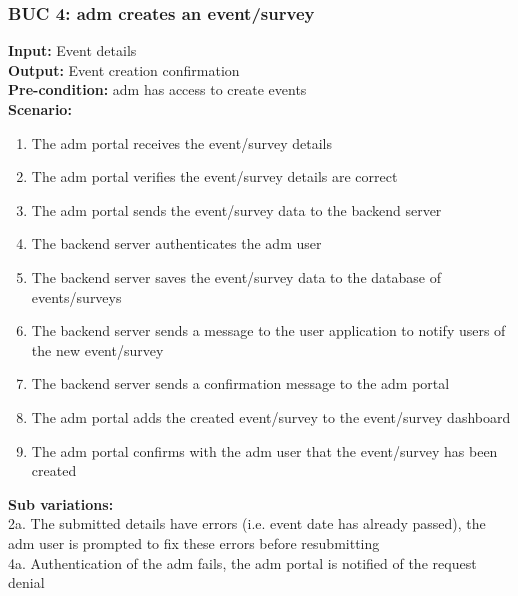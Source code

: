 \documentclass[12pt]{article}
\begin{document}
\subsubsection*{BUC 4: \Gls{adm} creates an event/survey}
\textbf{Input:} Event details \\
\textbf{Output:} Event creation confirmation \\
\textbf{Pre-condition:} \Gls{adm} has access to create events \\
\textbf{Scenario:} \\
\begin{enumerate}
  \item The \gls{adm} portal receives the event/survey details
  \item The \gls{adm} portal verifies the event/survey details are correct
  \item The \gls{adm} portal sends the event/survey data to the backend server
  \item The backend server authenticates the \gls{adm} user
  \item The backend server saves the event/survey data to the database of events/surveys
  \item The backend server sends a message to the user application to notify users of the new event/survey
  \item The backend server sends a confirmation message to the \gls{adm} portal
  \item The \gls{adm} portal adds the created event/survey to the event/survey dashboard
  \item The \gls{adm} portal confirms with the \gls{adm} user that the event/survey has been created
\end{enumerate}
\textbf{Sub variations:} \\
2a. The submitted details have errors (i.e. event date has already passed), the \gls{adm} user is prompted to fix these errors before resubmitting \\
4a. Authentication of the \gls{adm} fails, the \gls{adm} portal is notified of the request denial \\
\end{document}
